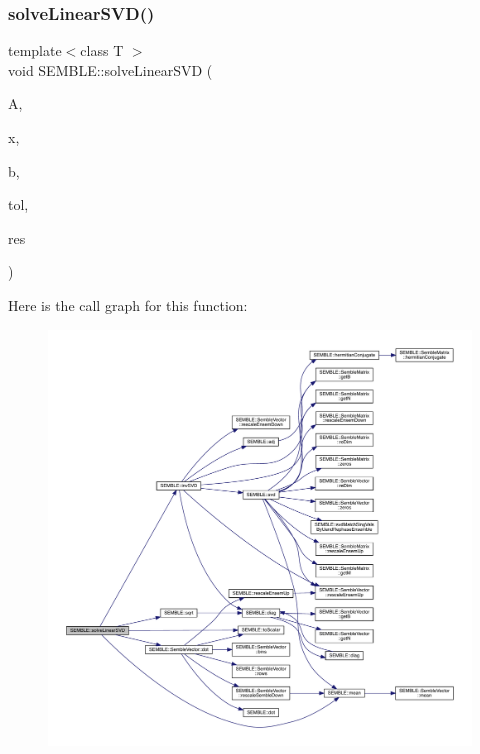 \subsubsection{\texorpdfstring{solveLinearSVD()}{solveLinearSVD()}\hspace{0.1cm}{\footnotesize\ttfamily [1/2]}}
{\footnotesize\ttfamily template$<$class T $>$ \\
void S\+E\+M\+B\+L\+E\+::solve\+Linear\+S\+VD (\begin{DoxyParamCaption}\item[{const \mbox{\hyperlink{structSEMBLE_1_1SembleMatrix}{Semble\+Matrix}}$<$ T $>$ \&}]{A,  }\item[{\mbox{\hyperlink{structSEMBLE_1_1SembleVector}{Semble\+Vector}}$<$ T $>$ \&}]{x,  }\item[{const \mbox{\hyperlink{structSEMBLE_1_1SembleVector}{Semble\+Vector}}$<$ T $>$ \&}]{b,  }\item[{const double}]{tol,  }\item[{double \&}]{res }\end{DoxyParamCaption})}

Here is the call graph for this function\+:
\nopagebreak
\begin{figure}[H]
\begin{center}
\leavevmode
\includegraphics[width=350pt]{d7/dfd/namespaceSEMBLE_adc86a1c9bd57aeb64bdc1ff2aebe41c4_cgraph}
\end{center}
\end{figure}
\mbox{\label{namespaceSEMBLE_ac312bc4ecb1ed4d73ae750e82fd799c1}} 
